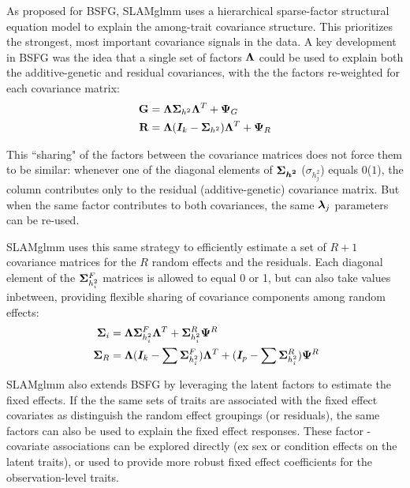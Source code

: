\documentclass[11pt]{amsart}
\newcommand*{\B}[1]{\ifmmode\bm{#1}\else\textbf{#1}\fi}
\begin{document}
As proposed for BSFG, SLAMglmm uses a hierarchical sparse-factor structural equation model to explain the among-trait covariance structure. This prioritizes the strongest, most important covariance signals in the data. A key development in BSFG was the idea that a single set of factors $\B{\Lambda}$ could be used to explain both the additive-genetic and residual covariances, with the the factors re-weighted for each covariance matrix:
\begin{align}\begin{split}
\B{G} &= \B{\Lambda} \B{\Sigma}_{h^2} \B{\Lambda}^T + \B{\Psi}_G \\
\B{R} &= \B{\Lambda} (\B{I}_k - \B{\Sigma}_{h^2}) \B{\Lambda}^T + \B{\Psi}_R 
\end{split} \end{align}

This ``sharing" of the factors between the covariance matrices does not force them to be similar: whenever one of the diagonal elements of $\B{\Sigma_{h^2}}$ ($\sigma_{h^2_j}$) equals $0$($1$), the column contributes only to the residual (additive-genetic) covariance matrix. But when the same factor contributes to both covariances, the same $\B{\lambda}_j$ parameters can be re-used.

SLAMglmm uses this same strategy to efficiently estimate a set of $R+1$ covariance matrices for the $R$ random effects and the residuals. Each diagonal element of the $\B{\Sigma}^F_{h^2_i}$ matrices is allowed to equal 0 or 1, but can also take values inbetween, providing flexible sharing of covariance components among random effects:
\begin{align}\begin{split}
\;\B{\Sigma}_i &= \B{\Lambda} \B{\Sigma}^F_{h^2_i} \B{\Lambda}^T + \B{\Sigma}^R_{h^2_i}\B{\Psi}^R \\
\;\B{\Sigma}_R &= \B{\Lambda} (\B{I}_k - \sum \B{\Sigma}^F_{h^2_i}) \B{\Lambda}^T + (\B{I}_p - \sum \B{\Sigma}^R_{h^2_i})\B{\Psi}^R 
\end{split} \end{align}

SLAMglmm also extends BSFG by leveraging the latent factors to estimate the fixed effects. If the the same sets of traits are associated with the fixed effect covariates as distinguish the random effect groupings (or residuals), the same factors can also be used to explain the fixed effect responses. These factor - covariate associations can be explored directly (ex sex or condition effects on the latent traits), or used to provide more robust fixed effect coefficients for the observation-level traits.
\end{document}
